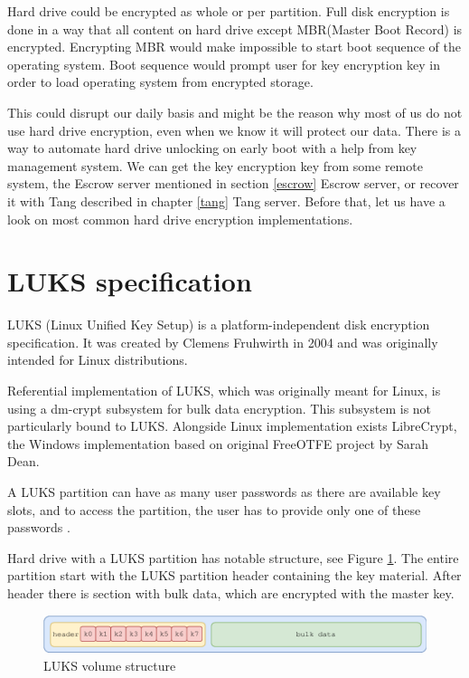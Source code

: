 Hard drive could be encrypted as whole or per partition.
Full disk encryption is done in a way that all content on hard drive except MBR(Master Boot Record) is encrypted.
Encrypting MBR would make impossible to start boot sequence of the operating system.
Boot sequence would prompt user for key encryption key in order to load operating system from encrypted storage.

This could disrupt our daily basis and might be the reason why most of us do not use hard drive encryption, even when we know it will protect our data.
There is a way to automate hard drive unlocking on early boot with a help from key management system.
We can get the key encryption key from some remote system, the Escrow server mentioned in section \ref{escrow} Escrow server, or recover it with Tang described in chapter \ref{tang} Tang server.
Before that, let us have a look on most common hard drive encryption implementations.

\section{LUKS specification}

LUKS (Linux Unified Key Setup) is a platform-independent disk encryption specification.
It was created by Clemens Fruhwirth in 2004 and was originally intended for Linux distributions.

Referential implementation of LUKS, which was originally meant for Linux, is using a dm-crypt subsystem for bulk data encryption.
This subsystem is not particularly bound to LUKS.
Alongside Linux implementation exists LibreCrypt, the Windows implementation based on original FreeOTFE \cite{FreeOTFE} project by Sarah Dean.

A LUKS partition can have as many user passwords as there are available key slots, and to access the partition, the user has to provide only one of these passwords \cite{LUKS}.

Hard drive with a LUKS partition has notable structure, see Figure \ref{fig:luksvol}.
The entire partition start with the LUKS partition header containing the key material.
After header there is section with bulk data, which are encrypted with the master key.

\begin{figure}[h]
    \centering
    \includegraphics[scale=0.7]{figures/LUKSdrive.pdf}
    \caption{LUKS volume structure}
    \label{fig:luksvol}
\end{figure}

